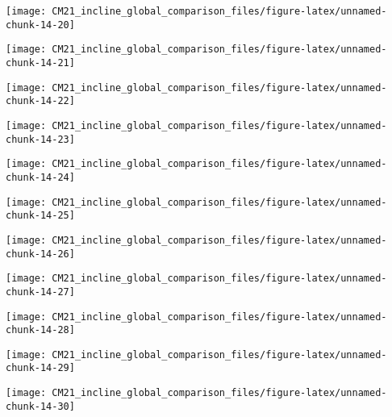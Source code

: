 \documentclass[
  10pt,
  a4paper,oneside]{article}
\begin{document}
\begin{center}\texttt{[image: CM21\_incline\_global\_comparison\_files/figure-latex/unnamed-chunk-14-20]} \end{center}

\begin{center}\texttt{[image: CM21\_incline\_global\_comparison\_files/figure-latex/unnamed-chunk-14-21]} \end{center}

\begin{center}\texttt{[image: CM21\_incline\_global\_comparison\_files/figure-latex/unnamed-chunk-14-22]} \end{center}

\begin{center}\texttt{[image: CM21\_incline\_global\_comparison\_files/figure-latex/unnamed-chunk-14-23]} \end{center}

\begin{center}\texttt{[image: CM21\_incline\_global\_comparison\_files/figure-latex/unnamed-chunk-14-24]} \end{center}

\begin{center}\texttt{[image: CM21\_incline\_global\_comparison\_files/figure-latex/unnamed-chunk-14-25]} \end{center}

\begin{center}\texttt{[image: CM21\_incline\_global\_comparison\_files/figure-latex/unnamed-chunk-14-26]} \end{center}

\begin{center}\texttt{[image: CM21\_incline\_global\_comparison\_files/figure-latex/unnamed-chunk-14-27]} \end{center}

\begin{center}\texttt{[image: CM21\_incline\_global\_comparison\_files/figure-latex/unnamed-chunk-14-28]} \end{center}

\begin{center}\texttt{[image: CM21\_incline\_global\_comparison\_files/figure-latex/unnamed-chunk-14-29]} \end{center}

\begin{center}\texttt{[image: CM21\_incline\_global\_comparison\_files/figure-latex/unnamed-chunk-14-30]} \end{center}
\end{document}

